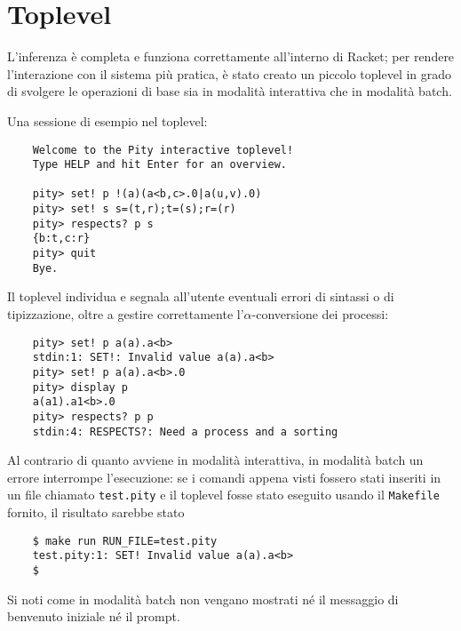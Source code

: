 \section{Toplevel}

L'inferenza \`e completa e funziona correttamente all'interno di Racket;
per rendere l'interazione con il sistema pi\`u pratica, \`e stato creato
un piccolo toplevel in grado di svolgere le operazioni di base sia in
modalit\`a interattiva che in modalit\`a batch.

Una sessione di esempio nel toplevel:

\begin{termlisting}
\begin{lstlisting}
    Welcome to the Pity interactive toplevel!
    Type HELP and hit Enter for an overview.

    pity> set! p !(a)(a<b,c>.0|a(u,v).0)
    pity> set! s s=(t,r);t=(s);r=(r)
    pity> respects? p s
    {b:t,c:r}
    pity> quit
    Bye.
\end{lstlisting}
\end{termlisting}

Il toplevel individua e segnala all'utente eventuali errori di sintassi
o di tipizzazione, oltre a gestire correttamente l'$\alpha$-conversione
dei processi:

\begin{termlisting}
\begin{lstlisting}
    pity> set! p a(a).a<b>
    stdin:1: SET!: Invalid value a(a).a<b>
    pity> set! p a(a).a<b>.0
    pity> display p
    a(a1).a1<b>.0
    pity> respects? p p
    stdin:4: RESPECTS?: Need a process and a sorting
\end{lstlisting}
\end{termlisting}

Al contrario di quanto avviene in modalit\`a interattiva, in modalit\`a
batch un errore interrompe l'esecuzione: se i comandi appena visti
fossero stati inseriti in un file chiamato \lstinline{test.pity} e il
toplevel fosse stato eseguito usando il \lstinline{Makefile} fornito,
il risultato sarebbe stato

\begin{termlisting}
\begin{lstlisting}
    $ make run RUN_FILE=test.pity
    test.pity:1: SET! Invalid value a(a).a<b>
    $
\end{lstlisting}
\end{termlisting}

Si noti come in modalit\`a batch non vengano mostrati n\'e il messaggio
di benvenuto iniziale n\'e il prompt.

